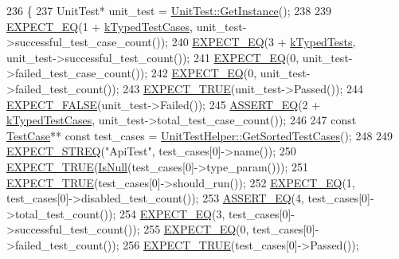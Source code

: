 \begin{DoxyCode}
236                           \{
237     UnitTest* unit\_test = \hyperlink{classtesting_1_1UnitTest_a24192400b70b3b946746954e9574fb8e}{UnitTest::GetInstance}();
238 
239     \hyperlink{gtest_8h_a4159019abda84f5366acdb7604ff220a}{EXPECT\_EQ}(1 + \hyperlink{namespacetesting_1_1internal_a685ea5332074ae63b0ded2b184ac2271}{kTypedTestCases}, unit\_test->successful\_test\_case\_count());
240     \hyperlink{gtest_8h_a4159019abda84f5366acdb7604ff220a}{EXPECT\_EQ}(3 + \hyperlink{namespacetesting_1_1internal_a53ee2d113744f9ba1d89469db4d7388b}{kTypedTests}, unit\_test->successful\_test\_count());
241     \hyperlink{gtest_8h_a4159019abda84f5366acdb7604ff220a}{EXPECT\_EQ}(0, unit\_test->failed\_test\_case\_count());
242     \hyperlink{gtest_8h_a4159019abda84f5366acdb7604ff220a}{EXPECT\_EQ}(0, unit\_test->failed\_test\_count());
243     \hyperlink{gtest_8h_ac33e7cdfb5d44a7a0f0ab552eb5c3c6a}{EXPECT\_TRUE}(unit\_test->Passed());
244     \hyperlink{gtest_8h_aeb6c7ae89f440c90c1a1815951c836da}{EXPECT\_FALSE}(unit\_test->Failed());
245     \hyperlink{gtest_8h_a1a6db8b1338ee7040329322b77779086}{ASSERT\_EQ}(2 + \hyperlink{namespacetesting_1_1internal_a685ea5332074ae63b0ded2b184ac2271}{kTypedTestCases}, unit\_test->total\_test\_case\_count());
246 
247     \textcolor{keyword}{const} \hyperlink{namespacegmock__test__utils_a959c5af591e4d49b6d35745205b64509}{TestCase}** \textcolor{keyword}{const} test\_cases = 
      \hyperlink{classtesting_1_1internal_1_1UnitTestHelper_a9a549307062083d10358638af272cc98}{UnitTestHelper::GetSortedTestCases}();
248 
249     \hyperlink{gtest_8h_ad20f7b94ac5081e16f0005b94e95f0c6}{EXPECT\_STREQ}(\textcolor{stringliteral}{"ApiTest"}, test\_cases[0]->name());
250     \hyperlink{gtest_8h_ac33e7cdfb5d44a7a0f0ab552eb5c3c6a}{EXPECT\_TRUE}(\hyperlink{namespacetesting_1_1internal_adcfd37a66bc4cb0e8291cf46e1a6c72b}{IsNull}(test\_cases[0]->type\_param()));
251     \hyperlink{gtest_8h_ac33e7cdfb5d44a7a0f0ab552eb5c3c6a}{EXPECT\_TRUE}(test\_cases[0]->should\_run());
252     \hyperlink{gtest_8h_a4159019abda84f5366acdb7604ff220a}{EXPECT\_EQ}(1, test\_cases[0]->disabled\_test\_count());
253     \hyperlink{gtest_8h_a1a6db8b1338ee7040329322b77779086}{ASSERT\_EQ}(4, test\_cases[0]->total\_test\_count());
254     \hyperlink{gtest_8h_a4159019abda84f5366acdb7604ff220a}{EXPECT\_EQ}(3, test\_cases[0]->successful\_test\_count());
255     \hyperlink{gtest_8h_a4159019abda84f5366acdb7604ff220a}{EXPECT\_EQ}(0, test\_cases[0]->failed\_test\_count());
256     \hyperlink{gtest_8h_ac33e7cdfb5d44a7a0f0ab552eb5c3c6a}{EXPECT\_TRUE}(test\_cases[0]->Passed());

\end{DoxyCode}
